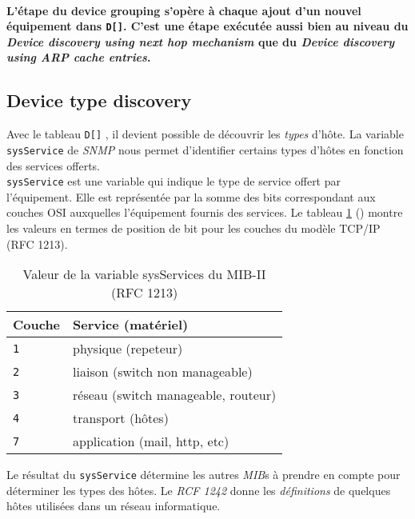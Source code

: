 \paragraph{L'étape du device grouping s'opère à chaque ajout d'un nouvel équipement dans \texttt{D[]}. C'est une étape exécutée aussi bien au niveau du \emph{Device discovery using next hop mechanism} que du \emph{Device discovery using ARP cache entries}.}


\subsection{Device type discovery}
Avec le tableau \texttt{D[]} , il devient possible de découvrir les \emph{types} d'hôte. La variable \texttt{sysService} de \emph{SNMP} nous permet d'identifier certains types d'hôtes en fonction des services offerts.\\
\texttt{sysService} est une variable qui indique le type de service offert par l'équipement. Elle est représentée par la somme des bits correspondant aux couches OSI auxquelles l'équipement fournis des services. Le tableau \ref{sysServices_mib} () montre les valeurs en termes de position de bit pour les couches du modèle TCP/IP (RFC 1213).
\begin{table}[h]
\begin{center}
 \begin{tabular}{|l|l|}
 \hline
 \textbf{Couche} & \textbf{Service (matériel)} \\\hline
 \texttt{1} & physique (repeteur) \\\hline
 \texttt{2} & liaison (switch non manageable) \\\hline
 \texttt{3} & réseau (switch manageable, routeur) \\\hline
 \texttt{4} & transport (hôtes) \\\hline
 \texttt{7} & application (mail, http, etc) \\\hline
 \end{tabular}
\caption{Valeur de la variable sysServices du  MIB-II (RFC 1213)} \label{sysServices_mib}
\end{center}
\end{table}
Le résultat du \texttt{sysService} détermine les autres \emph{MIB}s à prendre en compte pour déterminer les types des hôtes. Le \emph{RCF 1242} donne les \emph{définitions} de quelques hôtes utilisées dans un réseau informatique.

